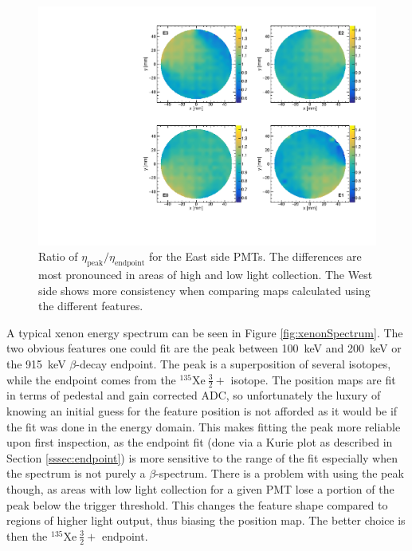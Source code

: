 \begin{figure}[h] 
\centering
\includegraphics[scale=.55]{4-UCNACalibrations/posmapComp_4_5mm_endpoint_vs_peak.pdf}
\caption{Ratio of $\eta_{\mathrm{peak}} / \eta_{\mathrm{endpoint}}$ for the East side PMTs. The differences
  are most pronounced in areas of high and low light collection. The West side shows more
  consistency when comparing maps calculated using the different features.}
\label{fig:posmapCompare}
\end{figure}

A typical xenon energy spectrum can be seen in Figure \ref{fig:xenonSpectrum}. The two obvious features one could
fit are the peak between 100~keV and 200~keV or the 915~keV $\beta$-decay endpoint. The peak is a
superposition of several isotopes, while the endpoint comes from the
$^{135}\mathrm{Xe~}\frac{3}{2}+$ isotope. The position maps are fit in terms of pedestal and gain corrected ADC,
so unfortunately the luxury of knowing an initial guess for the feature position is not afforded as it would
be if the fit was done in the energy domain. This makes
fitting the peak more reliable upon first inspection, as the endpoint fit (done via a Kurie plot as described
in Section \ref{sssec:endpoint}) is more sensitive to the range of the fit especially when the spectrum is not
purely a $\beta$-spectrum. There is a problem with using the peak though, as areas with low light collection
for a given PMT lose a portion of the peak below the trigger threshold. This changes the feature shape
compared to regions of higher light output, thus biasing the position map. The better choice is then the
$^{135}\mathrm{Xe~}\frac{3}{2}+$ endpoint. 

